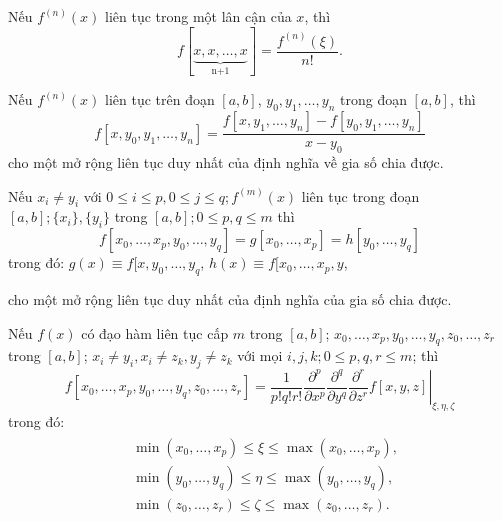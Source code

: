 \begin{coro}
    Nếu $f^{(n)}(x)$ liên tục trong một lân cận của $x$, thì
    \begin{equation}
        f[\underset{\text{n+1}}{\underbrace{x,x,\dots,x}}] = \frac{f^{(n)}(\xi)}{n!}.
    \end{equation}
\end{coro}
    
\begin{coro}
    Nếu $f^{(n)}(x)$ liên tục trên đoạn $[a, b]$, $y_0, y_1, \dots, y_n$ trong đoạn $[a, b]$, thì
    \begin{equation}
        f[x, y_0, y_1, \dots, y_n] = \frac{f[x, y_1, \dots, y_n]-f[y_0, y_1, \dots, y_n]}{x-y_0}
    \end{equation}
    cho một mở rộng liên tục duy nhất của định nghĩa về gia số chia được.
\end{coro}

\begin{coro}
    Nếu $x_i \ne y_i$ với $0 \leq i \leq p, 0 \leq j \leq q; f^{(m)}(x)$ liên tục trong đoạn $[a, b]; \{x_i\}, \{y_i\}$ trong $[a, b]; 0 \leq p, q\leq m$ thì
    \begin{equation}
        f[x_0, \dots, x_p, y_0, \dots, y_q] = g[x_0, \dots, x_p] = h[y_0, \dots, y_q]
    \end{equation}
    trong đó: $g(x) \equiv f[x, y_0, \dots, y_q$, $h(x) \equiv f[x_0, \dots, x_p, y$,

    cho một mở rộng liên tục duy nhất của định nghĩa của gia số chia được.
\end{coro}

\begin{coro}
    Nếu $f(x)$ có đạo hàm liên tục cấp $m$ trong $[a, b]$; $x_0, \dots, x_p, y_0, \dots, y_q, z_0, \dots, z_r$ trong $[a, b]$; $x_i \ne y_i, x_i \ne z_k, y_j \ne z_k$ với mọi $i, j, k; 0 \leq p,q,r \leq m$; thì
    \begin{equation}
        f[x_0, \dots, x_p, y_0, \dots, y_q, z_0, \dots, z_r] = \left .\frac{1}{p!q!r!}\frac{\partial^p}{\partial x^p}\frac{\partial^q}{\partial y^q}\frac{\partial^r}{\partial z^r}f[x,y,z]\right |_{\xi, \eta, \zeta}
    \end{equation}
    trong đó:
    \begin{align}
        \begin{aligned}
            &\min(x_0, \dots, x_p) \leq \xi \leq \max(x_0, \dots, x_p),\\
            &\min(y_0, \dots, y_q) \leq \eta \leq \max(y_0, \dots, y_q),\\
            &\min(z_0, \dots, z_r) \leq \zeta \leq \max(z_0, \dots, z_r).\\
        \end{aligned}
    \end{align}
\end{coro}

